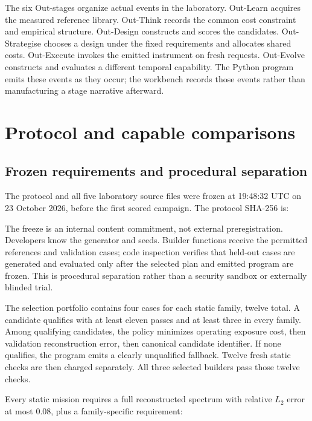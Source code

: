 \documentclass[11pt,a4paper]{article}
\begin{document}
The six Out-stages organize actual events in the laboratory. Out-Learn acquires the measured reference library. Out-Think records the common cost constraint and empirical structure. Out-Design constructs and scores the candidates. Out-Strategise chooses a design under the fixed requirements and allocates shared costs. Out-Execute invokes the emitted instrument on fresh requests. Out-Evolve constructs and evaluates a different temporal capability. The Python program emits these events as they occur; the workbench records those events rather than manufacturing a stage narrative afterward.

\section{Protocol and capable comparisons}

\subsection{Frozen requirements and procedural separation}

The protocol and all five laboratory source files were frozen at 19:48:32 UTC on 23 October 2026, before the first scored campaign. The protocol SHA-256 is:
\begin{quote}\small\ttfamily
{}
\end{quote}
The freeze is an internal content commitment, not external preregistration. Developers know the generator and seeds. Builder functions receive the permitted references and validation cases; code inspection verifies that held-out cases are generated and evaluated only after the selected plan and emitted program are frozen. This is procedural separation rather than a security sandbox or externally blinded trial.

The selection portfolio contains four cases for each static family, twelve total. A candidate qualifies with at least eleven passes and at least three in every family. Among qualifying candidates, the policy minimizes operating exposure cost, then validation reconstruction error, then canonical candidate identifier. If none qualifies, the program emits a clearly unqualified fallback. Twelve fresh static checks are then charged separately. All three selected builders pass those twelve checks.

Every static mission requires a full reconstructed spectrum with relative \(L_2\) error at most 0.08, plus a family-specific requirement:
\end{document}
